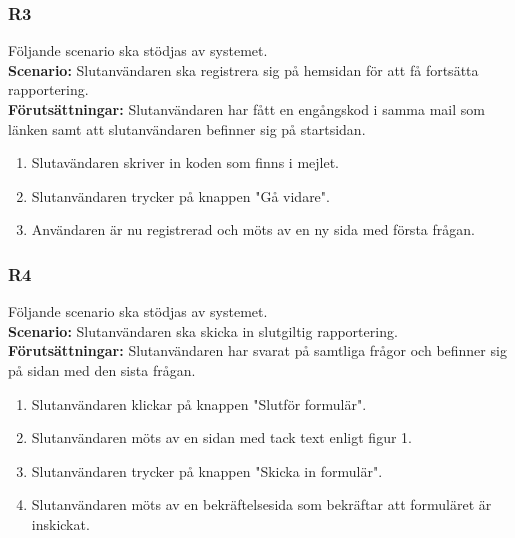 \documentclass{article}
\begin{document}
        \subsubsection*{R3}
    Följande scenario ska stödjas av systemet.
        \\
       \indent \textbf{Scenario:} Slutanvändaren ska registrera sig på hemsidan för att få fortsätta rapportering.
        \\
       \indent \textbf{Förutsättningar:} Slutanvändaren har fått en engångskod i samma mail som länken samt att slutanvändaren befinner sig på startsidan.
            \begin{enumerate}
               \item Slutavändaren skriver in koden som finns i mejlet.
               \item Slutanvändaren trycker på knappen "Gå vidare".
                \item  Användaren är nu registrerad och möts av en ny sida med första frågan.
            \end{enumerate}
   
        \subsubsection*{R4}
    Följande scenario ska stödjas av systemet.
        \\
       \indent \textbf{Scenario:} Slutanvändaren ska skicka in slutgiltig rapportering.
        \\
       \indent \textbf{Förutsättningar:} Slutanvändaren har svarat på samtliga frågor och befinner sig på sidan med den sista frågan.
            \begin{enumerate}
                \item Slutanvändaren klickar på knappen "Slutför formulär".
                \item Slutanvändaren möts av en sidan med tack text enligt figur 1.
                \item Slutanvändaren trycker på knappen "Skicka in formulär".
                \item   Slutanvändaren möts av en bekräftelsesida som bekräftar att formuläret är inskickat.
            \end{enumerate}
\end{document}
